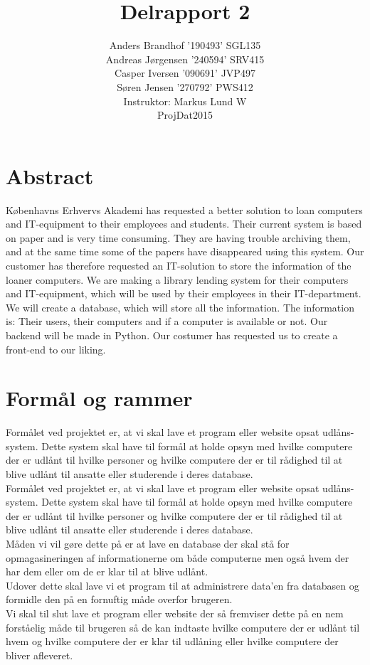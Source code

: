\documentclass[a4paper]{article}
\title{Delrapport 2}
\author{Anders Brandhof '190493' SGL135 \\ Andreas Jørgensen '240594' SRV415 \\ Casper Iversen '090691' JVP497 \\ Søren Jensen '270792' PWS412 \\
Instruktor: Markus Lund W\\
ProjDat2015}
\begin{document}
\maketitle

\pagebreak

\tableofcontents

\newpage

\section{Abstract}
Københavns Erhvervs Akademi has requested a better solution to loan computers and IT-equipment to their employees and students. Their current system is based on paper and is very time consuming. They are having trouble archiving them, and at the same time some of the papers have disappeared using this system. Our customer has therefore requested an IT-solution to store the information of the loaner computers. We are making a library lending system for their computers and IT-equipment, which will be used by their employees in their IT-department. We will create a database, which will store all the information. The information is: Their users, their computers and if a computer is available or not. Our backend will be made in Python. Our costumer has requested us to create a front-end to our liking. \\
\section{Formål og rammer}
Formålet ved projektet er, at vi skal lave et program eller website opsat udlåns-system. Dette system skal have til formål at holde opsyn med hvilke computere der er udlånt til hvilke personer og hvilke computere der er til rådighed til at blive udlånt til ansatte eller studerende i deres database.\\
Formålet ved projektet er, at vi skal lave et program eller website opsat udlåns-system. Dette system skal have til formål at holde opsyn med hvilke computere der er udlånt til hvilke personer og hvilke computere der er til rådighed til at blive udlånt til ansatte eller studerende i deres database.\\
Måden vi vil gøre dette på er at lave en database der skal stå for opmagasineringen af informationerne om både computerne men også hvem der har dem eller om de er klar til at blive udlånt.\\
Udover dette skal lave vi et program til at administrere data’en fra databasen og formidle den på en fornuftig måde overfor brugeren.\\
Vi skal til slut lave et program eller website der så fremviser dette på en nem forståelig måde til brugeren så de kan indtaste hvilke computere der er udlånt til hvem og hvilke computere der er klar til udlåning eller hvilke computere der bliver afleveret.\\ \\
\end{document}
